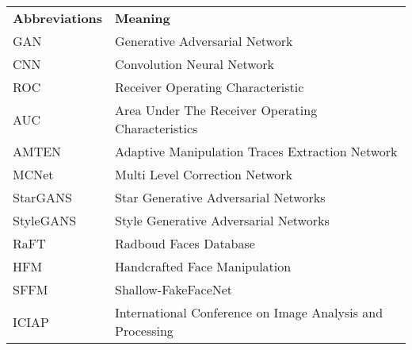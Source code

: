 \begin{table}[h]
	\begin{tabular}{l l}
		\textbf{Abbreviations} & \textbf{Meaning}                                   \\
		GAN                    & Generative Adversarial Network                     \\
		CNN	                   & Convolution Neural Network                         \\
		ROC                    & Receiver Operating Characteristic                  \\
		AUC                    & Area Under The Receiver Operating Characteristics  \\
		AMTEN 								 & Adaptive Manipulation Traces Extraction Network    \\ 
		MCNet                  & Multi Level Correction Network 	                  \\
		StarGANS               & Star Generative Adversarial Networks               \\
		StyleGANS              & Style Generative Adversarial Networks              \\
		RaFT                   & Radboud Faces Database                							\\
		HFM 									 & Handcrafted Face Manipulation           						\\
		SFFM									 & Shallow-FakeFaceNet																\\
		ICIAP									 & International Conference on Image Analysis and Processing \\
	\end{tabular}
\end{table}
\pagebreak